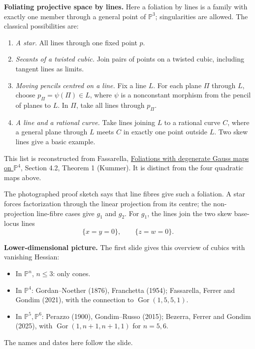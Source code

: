 \medskip\noindent
\textbf{Foliating projective space by
lines.}
Here a foliation by lines is a
family with exactly one member through a
general point of $\mathbb{P}^3$;
singularities are allowed.
The classical possibilities are:
\begin{enumerate}
\item \emph{A star.} All lines through
one fixed point $p$.
\item \emph{Secants of a twisted cubic.}
Join pairs of points on a twisted cubic,
including tangent lines as limits.
\item \emph{Moving pencils centred on a
line.} Fix a line $L$. For each plane
$\Pi$ through $L$, choose
$p_\Pi=\psi(\Pi)\in L$, where $\psi$ is a
nonconstant morphism from the pencil of
planes to $L$. In $\Pi$, take all lines
through $p_\Pi$.
\item \emph{A line and a rational curve.}
Take lines joining $L$ to a rational
curve $C$, where a general plane through
$L$ meets $C$ in exactly one point
outside $L$. Two skew lines give a
basic example.
\end{enumerate}
This list is reconstructed from
Fassarella,
\href{https://arxiv.org/abs/0809.2761}
{Foliations with degenerate Gauss maps
on $\mathbb{P}^4$},
Section 4.2, Theorem 1 (Kummer).
It is distinct from the four quadratic
maps above.

The photographed proof sketch says that
line fibres give such a foliation.
A star forces factorization through the
linear projection from its centre;
the non-projection line-fibre cases give
$g_1$ and $g_2$.
For $g_1$, the lines join the two skew
base-locus lines
$$
\{x=y=0\},\qquad\{z=w=0\}.
$$

\medskip\noindent
\textbf{Lower-dimensional picture.}
The first slide gives this overview of
cubics with vanishing Hessian:
\begin{itemize}
\item In $\mathbb{P}^n$, $n\leq3$:
only cones.
\item In $\mathbb{P}^4$:
Gordan--Noether (1876), Franchetta (1954);
Fassarella, Ferrer and Gondim (2021),
with the connection to
$\operatorname{Gor}(1,5,5,1)$.
\item In $\mathbb{P}^5,\mathbb{P}^6$:
Perazzo (1900), Gondim--Russo (2015);
Bezerra, Ferrer and Gondim (2025), with
$\operatorname{Gor}(1,n+1,n+1,1)$
for $n=5,6$.
\end{itemize}
The names and dates here follow the slide.

